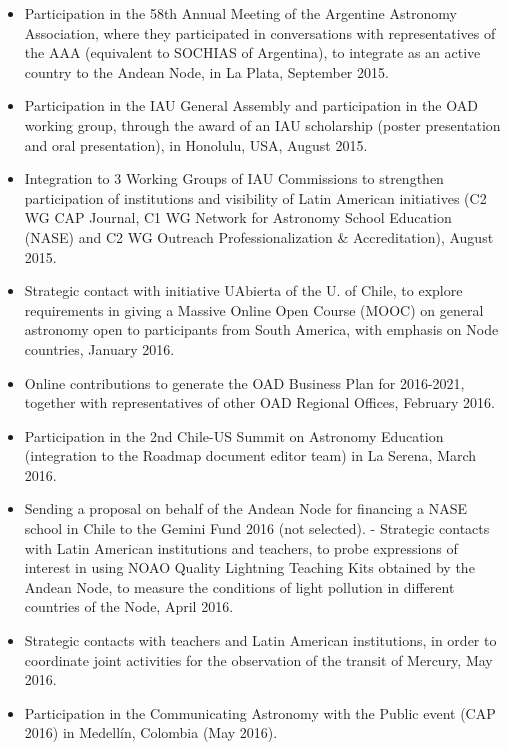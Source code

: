 \begin{itemize}
    \item Participation in the 58th Annual Meeting of the Argentine Astronomy Association, where they participated in conversations with representatives of the AAA (equivalent to SOCHIAS of Argentina), to integrate as an active country to the Andean Node, in La Plata, September 2015.

    \item Participation in the IAU General Assembly and participation in the OAD working group, through the award of an IAU scholarship (poster presentation and oral presentation), in Honolulu, USA, August 2015.

    \item Integration to 3 Working Groups of IAU Commissions to strengthen participation of institutions and visibility of Latin American initiatives (C2 WG CAP Journal, C1 WG Network for Astronomy School Education (NASE) and C2 WG Outreach Professionalization & Accreditation), August 2015.

    \item Strategic contact with initiative UAbierta of the U. of Chile, to explore requirements in giving a Massive Online Open Course (MOOC) on general astronomy open to participants from South America, with emphasis on Node countries, January 2016.

    \item Online contributions to generate the OAD Business Plan for 2016-2021, together with representatives of other OAD Regional Offices, February 2016.

    \item Participation in the 2nd Chile-US Summit on Astronomy Education (integration to the Roadmap document editor team) in La Serena, March 2016.

    \item Sending a proposal on behalf of the Andean Node for financing a NASE school in Chile to the Gemini Fund 2016 (not selected). - Strategic contacts with Latin American institutions and teachers, to probe expressions of interest in using NOAO Quality Lightning Teaching Kits obtained by the Andean Node, to measure the conditions of light pollution in different countries of the Node, April 2016.

    \item Strategic contacts with teachers and Latin American institutions, in order to coordinate joint activities for the observation of the transit of Mercury, May 2016.

    \item Participation in the Communicating Astronomy with the Public event (CAP 2016) in Medellín, Colombia (May 2016).


\end{itemize}
